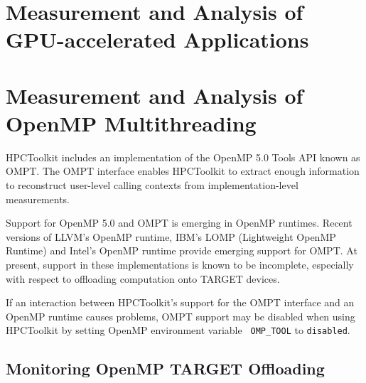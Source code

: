 \documentclass[11pt,twoside,letterpaper]{report}
\begin{document}

\cleardoublepage
\chapter{Measurement and Analysis of GPU-accelerated Applications}
\label{chpt:gpu}





\cleardoublepage
\chapter{Measurement and Analysis of OpenMP Multithreading}
\label{chpt:gpu}

{
\centering
 \vspace{2ex}
}

HPCToolkit includes an implementation of the OpenMP 5.0 Tools API
known as OMPT. The OMPT interface enables HPCToolkit to extract
enough information to reconstruct user-level calling contexts from
implementation-level measurements.

Support for OpenMP 5.0 and OMPT is emerging in OpenMP runtimes.
Recent versions of LLVM's OpenMP runtime, IBM's LOMP (Lightweight
OpenMP Runtime) and Intel's OpenMP runtime provide emerging support
for OMPT. At present, support in these implementations is known to
be incomplete, especially with respect to offloading computation
onto TARGET devices.

If an interaction between HPCToolkit's support for the OMPT interface
and an OpenMP runtime causes problems, OMPT support may be disabled
when using HPCToolkit by setting  OpenMP environment variable {\tt
OMP\_TOOL} to {\tt disabled}.

\section{Monitoring OpenMP TARGET Offloading}
\end{document}
